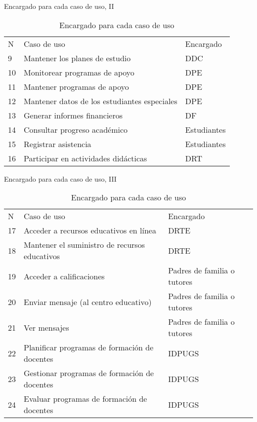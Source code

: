 \documentclass[xcolor=table, aspectratio=169]{beamer}
\begin{document}
\begin{frame}[t]{Encargado para cada caso de uso, II}
	\begin{table}[H]
		\centering
		\caption{Encargado para cada caso de uso}
		\label{facts}
		\begin{tabular}{lll}
			\rowcolor[HTML]{333333}
			{\color[HTML]{FFFFFF} N} & {\color[HTML]{FFFFFF} Caso de uso} & {\color[HTML]{FFFFFF} Encargado} \\
    		9 & Mantener los planes de estudio & DDC \\
    		10 & Monitorear programas de apoyo & DPE \\
    		11 & Mantener programas de apoyo & DPE \\
    		12 & Mantener datos de los estudiantes especiales & DPE \\
    		13 & Generar informes financieros & DF \\
    		14 & Consultar progreso acad\'emico & Estudiantes \\
    		15 & Registrar asistencia & Estudiantes \\
    		16 & Participar en actividades did\'acticas & DRT
		\end{tabular}
	\end{table}
\end{frame}

\begin{frame}[t]{Encargado para cada caso de uso, III}
	\begin{table}[H]
		\centering
		\caption{Encargado para cada caso de uso}
		\label{facts}
		\begin{tabular}{lll}
			\rowcolor[HTML]{333333}
			{\color[HTML]{FFFFFF} N} & {\color[HTML]{FFFFFF} Caso de uso} & {\color[HTML]{FFFFFF} Encargado} \\
    		17 & Acceder a recursos educativos en l\'inea & DRTE \\
    		18 & Mantener el suministro de recursos educativos & DRTE \\
    		19 & Acceder a calificaciones & Padres de familia o tutores \\
    		20 & Enviar mensaje (al centro educativo) & Padres de familia o tutores \\
    		21 & Ver mensajes & Padres de familia o tutores \\
    		22 & Planificar programas de formaci\'on de docentes & IDPUGS \\
    		23 & Gestionar programas de formaci\'on de docentes & IDPUGS \\
    		24 & Evaluar programas de formaci\'on de docentes & IDPUGS
		\end{tabular}
	\end{table}
\end{frame}
\end{document}
